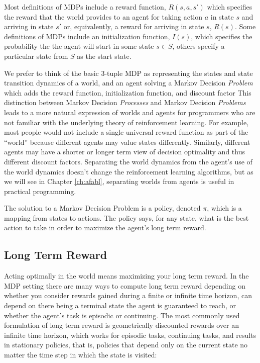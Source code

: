 Most definitions of MDPs include a reward function, $R(s, a, s')$ which specifies the reward that the world provides to an agent for taking action $a$ in state $s$ and arriving in state $s'$ or, equivalently, a reward for arriving in state $s$, $R(s)$. Some definitions of MDPs include an initialization function, $I(s)$, which specifies the probability the the agent will start in some state $s \in S$, others specify a particular state from $S$ as the start state.

We prefer to think of the basic 3-tuple MDP as representing the states and state transition dynamics of a world, and an agent solving a Markov Decision {\it Problem} which adds the reward function, initialization function, and discount factor  This distinction between Markov Decision {\it Processes} and Markov Decision {\it Problems} leads to a more natural expression of worlds and agents for programmers who are not familiar with the underlying theory of reinforcement learning. For example, most people would not include a single universal reward function as part of the ``world'' because different agents may value states differently. Similarly, different agents may have a shorter or longer term view of decision optimality and thus different discount factors. Separating the world dynamics from the agent's use of the world dynamics doesn't change the reinforcement learning algorithms, but as we will see in Chapter \ref{ch:afabl}, separating worlds from agents is useful in practical programming.

The solution to a Markov Decision Problem is a policy, denoted $\pi$, which is a mapping from states to actions. The policy says, for any state, what is the best action to take in order to maximize the agent's long term reward.

\subsection{Long Term Reward}

Acting optimally in the world means maximizing your long term reward. In the MDP setting there are many ways to compute long term reward depending on whether you consider rewards gained during a finite or infinite time horizon, can depend on there being a terminal state the agent is guaranteed to reach, or whether the agent's task is episodic or continuing. The most commonly used formulation of long term reward is geometrically discounted rewards over an infinite time horizon, which works for episodic tasks, continuing tasks, and results in stationary policies, that is, policies that depend only on the current state no matter the time step in which the state is visited:

